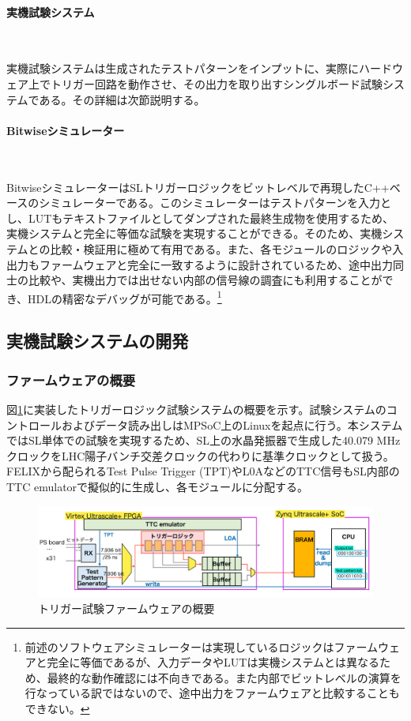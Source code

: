 \paragraph{実機試験システム}　　
\par
実機試験システムは生成されたテストパターンをインプットに、実際にハードウェア上でトリガー回路を動作させ、その出力を取り出すシングルボード試験システムである。その詳細は次節説明する。

\paragraph{Bitwiseシミュレーター}　　
\par
BitwiseシミュレーターはSLトリガーロジックをビットレベルで再現したC++ベースのシミュレーターである。このシミュレーターはテストパターンを入力とし、LUTもテキストファイルとしてダンプされた最終生成物を使用するため、実機システムと完全に等価な試験を実現することができる。そのため、実機システムとの比較・検証用に極めて有用である。また、各モジュールのロジックや入出力もファームウェアと完全に一致するように設計されているため、途中出力同士の比較や、実機出力では出せない内部の信号線の調査にも利用することができ、HDLの精密なデバッグが可能である。\footnote{前述のソフトウェアシミュレーターは実現しているロジックはファームウェアと完全に等価であるが、入力データやLUTは実機システムとは異なるため、最終的な動作確認には不向きである。また内部でビットレベルの演算を行なっている訳ではないので、途中出力をファームウェアと比較することもできない。}

\subsection{実機試験システムの開発}
\subsubsection*{ファームウェアの概要}
図\ref{TestSystem_Overview}に実装したトリガーロジック試験システムの概要を示す。試験システムのコントロールおよびデータ読み出しはMPSoC上のLinuxを起点に行う。本システムではSL単体での試験を実現するため、SL上の水晶発振器で生成した40.079 MHzクロックをLHC陽子バンチ交差クロックの代わりに基準クロックとして扱う。FELIXから配られるTest Pulse Trigger (TPT)やL0AなどのTTC信号もSL内部のTTC emulatorで擬似的に生成し、各モジュールに分配する。

\begin{figure} 
\centering
\includegraphics[width=16cm]{fig/Test/TestSystem_overview.png}
\caption[トリガー試験ファームウェアの概要]{トリガー試験ファームウェアの概要}
\label{TestSystem_Overview}
\end{figure}


